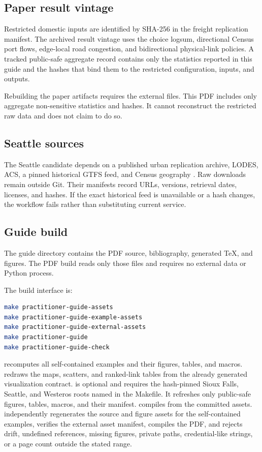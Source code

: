 \subsection{Paper result vintage}

Restricted domestic inputs are identified by SHA-256 in the freight
replication manifest. The archived result vintage uses the choice logsum,
directional Census port
flows, edge-local road congestion, and bidirectional physical-link policies.
A tracked public-safe aggregate record contains only the statistics reported
in this guide and the hashes that bind them to the restricted configuration,
inputs, and outputs.

Rebuilding the paper artifacts requires the external files. This PDF includes
only aggregate non-sensitive statistics and hashes. It cannot reconstruct the
restricted raw data and does not claim to do so.

\subsection{Seattle sources}

The Seattle candidate depends on a published urban replication archive,
LODES, ACS, a pinned historical GTFS feed, and Census geography
\citep{AA_2022restud,CensusLODES,CensusACS2017B08301,KingCountyGTFS2017}. Raw
downloads remain outside Git. Their manifests record URLs, versions, retrieval
dates, licenses, and hashes. If the exact historical feed is unavailable or a
hash changes, the workflow fails rather than substituting current service.

\subsection{Guide build}

The guide directory contains the PDF source, bibliography, generated TeX, and
figures. The PDF build reads only those files and requires no external data or
Python process.

The build interface is:
\begin{lstlisting}[language=bash]
make practitioner-guide-assets
make practitioner-guide-example-assets
make practitioner-guide-external-assets
make practitioner-guide
make practitioner-guide-check
\end{lstlisting}
 recomputes all self-contained examples and
their figures, tables, and macros.
 redraws the maps, scatters, and
ranked-link tables from the already generated visualization contract.
 is optional and requires the
hash-pinned Sioux Falls, Seattle, and Westeros roots named in the Makefile.
It refreshes only public-safe figures, tables, macros, and their manifest.
 compiles from the committed assets.
 independently regenerates the source and figure
assets for the self-contained examples, verifies the external asset manifest,
compiles the PDF, and rejects drift, undefined references, missing figures,
private paths, credential-like strings, or a page count outside the stated
range.

